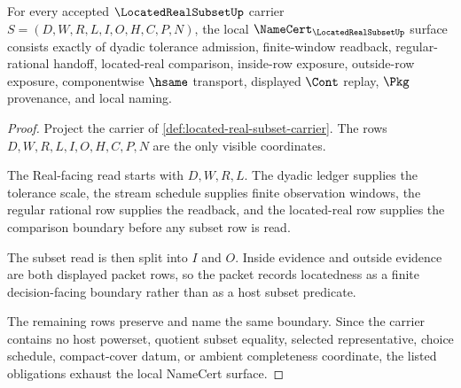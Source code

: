 \begin{theorem}
\label{thm:located-real-subset-namecert-obligations}
For every accepted $\LocatedRealSubsetUp$ carrier $S=(D,W,R,L,I,O,H,C,P,N)$, the local $\NameCert_{\LocatedRealSubsetUp}$ surface consists exactly of dyadic tolerance admission, finite-window readback, regular-rational handoff, located-real comparison, inside-row exposure, outside-row exposure, componentwise $\hsame$ transport, displayed $\Cont$ replay, $\Pkg$ provenance, and local naming.
\end{theorem}
\begin{proof}
Project the carrier of \autoref{def:located-real-subset-carrier}. The rows $D,W,R,L,I,O,H,C,P,N$ are the only visible coordinates.

The Real-facing read starts with $D,W,R,L$. The dyadic ledger supplies the tolerance scale, the stream schedule supplies finite observation windows, the regular rational row supplies the readback, and the located-real row supplies the comparison boundary before any subset row is read.

The subset read is then split into $I$ and $O$. Inside evidence and outside evidence are both displayed packet rows, so the packet records locatedness as a finite decision-facing boundary rather than as a host subset predicate.

The remaining rows preserve and name the same boundary. Since the carrier contains no host powerset, quotient subset equality, selected representative, choice schedule, compact-cover datum, or ambient completeness coordinate, the listed obligations exhaust the local NameCert surface.
\end{proof}

